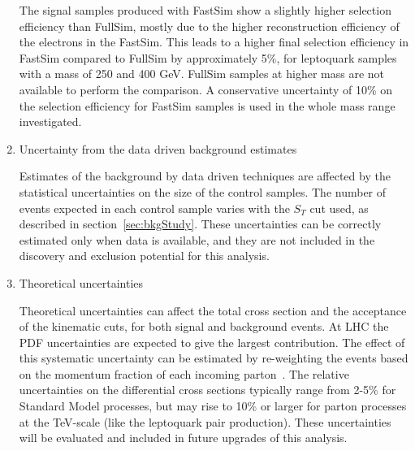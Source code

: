 \begin{enumerate}
The signal samples produced with FastSim show a slightly higher selection efficiency than FullSim, 
mostly due to the higher reconstruction efficiency of the electrons in the FastSim. 
This leads to a higher final selection efficiency in FastSim compared to FullSim by approximately 5\%, 
for leptoquark samples with a mass of 250 and 400 GeV. FullSim samples at higher mass are not available 
to perform the comparison. A conservative uncertainty of 10\% on the selection efficiency 
for FastSim samples is used in the whole mass range investigated. 
%
\item Uncertainty from the data driven background estimates

Estimates of the background by data driven techniques are affected by the statistical
uncertainties on the size of the control samples.
The number of events expected in each control sample varies with the $S_T$ cut used, as 
described in section~\ref{sec:bkgStudy}. These uncertainties can be correctly estimated 
only when data is available, and they are not included in the discovery and exclusion potential
for this analysis.
%
\item Theoretical uncertainties 

Theoretical uncertainties can affect the total cross section and the acceptance of the kinematic cuts, for both signal 
and background events. At LHC the PDF uncertainties are expected to give the largest contribution. 
The effect of this systematic uncertainty can be estimated by re-weighting 
the events based on the momentum fraction of each incoming parton~\cite{PDFRescaling}.
The relative uncertainties on the differential cross sections 
typically range from 2-5\% for Standard Model processes, 
but may rise to 10\% or larger for parton processes at the TeV-scale 
(like the leptoquark pair production).
These uncertainties will be evaluated and included in future upgrades of this analysis.
%
\end{enumerate}
%
%

